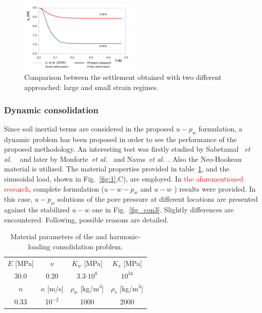 \documentclass[twocolumn]{svjour3}          %
\newcommand{\etal}{
  \textit{et al.}
}
\begin{document}
\begin{figure}
  \includegraphics[width=0.5\textwidth]{Fig/borja2.pdf}
\caption{Comparison between the settlement obtained with two different approached: large and small strain regimes.}
\label{fig:6}      
\end{figure}

\subsubsection{Dynamic consolidation}
\label{sec:5:1:2}

Since soil inertial terms are considered in the proposed $u-p_w$ formulation, a dynamic problem has been proposed in order to see the performance of the proposed methodology. An interesting test was firstly studied by Sabetamal~\etal~\cite{Sabetamal:2015} and later by Monforte~\textit{et al.}~\cite{Monforte2019} and Navas~\textit{et al.}~\cite{Navas2016b,Navas2021}. Also the Neo-Hookean material is utilized. The material properties provided in table~\ref{tab:2}, and the sinusoidal load, shown in Fig.~\ref{fig:1},C), are employed. In \textcolor{red}{the aforementioned research}, complete formulation ($u-w-p_w$ and  $u-w$ ) results were provided. In this case, $u-p_w$ solutions of the pore pressure at different locations are presented against the stabilized $u-w$ one in Fig.~\ref{fig_con3}. Slightly differences are encountered. Following, possible reasons are detailed.

\begin{table}[!t]
\centering
\caption{ Material parameters of the and harmonic-loading consolidation problem.} \label{tab:2}
	\vspace*{0.2cm}
	\begin{tabular}{cccc}
$E$ [MPa] & $\nu$ & $K_w$ [MPa] & $K_s$ [MPa] \\
		\noalign{\smallskip}\hline\noalign{\smallskip}
	 30.0& 0.20 & 3.3$\cdot 10^8$ & $10^{34}$ \\
	 \noalign{\smallskip}\hline\hline\noalign{\smallskip}
	  $n$ & $\kappa$ [m/s] & $\rho_w$ [kg/$\textrm{m}^3$] & $\rho_s$ [kg/$\textrm{m}^3$]\\
	  \noalign{\smallskip}\hline\noalign{\smallskip}
	  0.33  & 10$^{-2} $& 1000 & 2000
	\end{tabular}
\end{table}
\end{document}
